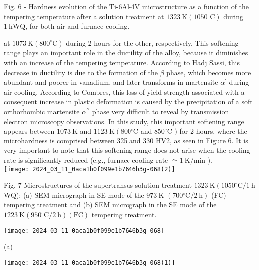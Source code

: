 \documentclass[10pt]{article}
\begin{document}
Fig. 6 - Hardness evolution of the Ti-6Al-4V microstructure as a function of the tempering temperature after a solution treatment at $1323 \mathrm{~K}\left(1050{ }^{\circ} \mathrm{C}\right)$ during $1 \mathrm{~h} \mathrm{WQ}$, for both air and furnace cooling.

at $1073 \mathrm{~K}\left(800^{\circ} \mathrm{C}\right)$ during 2 hours for the other, respectively. This softening range plays an important role in the ductility of the alloy, because it diminishes with an increase of the tempering temperature. According to Hadj Sassi, this decrease in ductility is due to the formation of the $\beta$ phase, which becomes more abundant and poorer in vanadium, and later transforms in martensite $\alpha^{\prime}$ during air cooling. According to Combres, this loss of yield strength associated with a consequent increase in plastic deformation is caused by the precipitation of a soft orthorhombic martensite $\alpha^{\prime \prime}$ phase very difficult to reveal by transmission electron microscopy observations. In this study, this important softening range appears between $1073 \mathrm{~K}$ and $1123 \mathrm{~K}\left(800{ }^{\circ} \mathrm{C}\right.$ and $850^{\circ} \mathrm{C}$ ) for 2 hours, where the microhardness is comprised between 325 and 330 HV2, as seen in Figure 6. It is very important to note that this softening range does not arise when the cooling rate is significantly reduced (e.g., furnace cooling rate $\simeq 1 \mathrm{~K} / \mathrm{min}$ ).\\
\texttt{[image: 2024\_03\_11\_0aca1b0f099e1b7646b3g-068(2)]}

Fig. 7-Microstructures of the supertransus solution treatment $1323 \mathrm{~K}\left(1050^{\circ} \mathrm{C} / 1 \mathrm{~h}\right.$ WQ): (a) SEM micrograph in SE mode of the $973 \mathrm{~K}$ $\left(700{ }^{\circ} \mathrm{C} / 2 \mathrm{~h}\right)$ (FC) tempering treatment and (b) SEM micrograph in the SE mode of the $1223 \mathrm{~K}\left(950{ }^{\circ} \mathrm{C} / 2 \mathrm{~h}\right)(\mathrm{FC})$ tempering treatment.

\begin{center}
\texttt{[image: 2024\_03\_11\_0aca1b0f099e1b7646b3g-068]}
\end{center}

(a)

\begin{center}
\texttt{[image: 2024\_03\_11\_0aca1b0f099e1b7646b3g-068(1)]}
\end{center}
\end{document}
